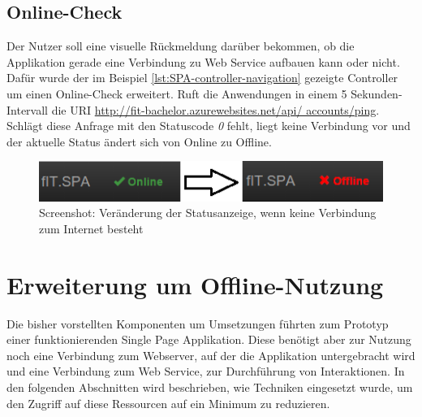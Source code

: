 \subsection{Online-Check}
\label{ssec:Online-Check}
Der Nutzer soll eine visuelle Rückmeldung darüber bekommen, ob die Applikation gerade eine Verbindung zu Web Service aufbauen kann oder nicht. Dafür wurde der im Beispiel \ref{lst:SPA-controller-navigation} gezeigte Controller um einen Online-Check erweitert. Ruft die Anwendungen in einem 5 Sekunden-Intervall die \ac{URI} \href{http://fit-bachelor.azurewebsites.net/api/accounts/ping}{http://fit-bachelor.azurewebsites.net/api/ accounts/ping}. Schlägt diese Anfrage mit den Statuscode \textit{0} fehlt, liegt keine Verbindung vor und der aktuelle Status ändert sich von Online zu Offline.
\begin{figure}[h]
\centering
\includegraphics[width=0.8\linewidth]{content/images/SPA-Online-Check}
\caption{Screenshot: Veränderung der Statusanzeige, wenn keine Verbindung zum Internet besteht}
\label{pic:SPA:OnlineCheck:Statusänderung}
\end{figure}

\section{Erweiterung um Offline-Nutzung}
\label{sec:CachedHttpService}
Die bisher vorstellten Komponenten um Umsetzungen führten zum Prototyp einer funktionierenden Single Page Applikation. Diese benötigt aber zur Nutzung noch eine Verbindung zum Webserver, auf der die Applikation untergebracht wird und eine Verbindung zum Web Service, zur Durchführung von Interaktionen. In den folgenden Abschnitten wird beschrieben, wie Techniken eingesetzt wurde, um den Zugriff auf diese Ressourcen auf ein Minimum zu reduzieren. 
